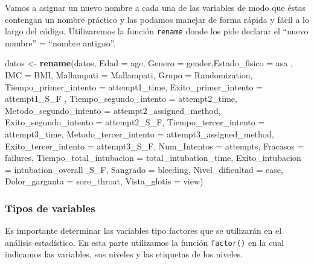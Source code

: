 \documentclass[
]{article}
\newenvironment{Shaded}{\begin{snugshade}}{\end{snugshade}}
\newcommand{\AttributeTok}[1]{\textcolor[rgb]{0.13,0.29,0.53}{#1}}
\newcommand{\FunctionTok}[1]{\textcolor[rgb]{0.13,0.29,0.53}{\textbf{#1}}}
\newcommand{\NormalTok}[1]{#1}
\newcommand{\OtherTok}[1]{\textcolor[rgb]{0.56,0.35,0.01}{#1}}
\begin{document}
Vamos a asignar un nuevo nombre a cada una de las variables de modo que
éstas contengan un nombre práctico y las podamos manejar de forma rápida
y fácil a lo largo del código. Utilizaremos la función \texttt{rename}
donde los pide declarar el ``nuevo nombre'' = ``nombre antiguo''.

\begin{Shaded}
\begin{Highlighting}[]
\NormalTok{datos }\OtherTok{\textless{}{-}} \FunctionTok{rename}\NormalTok{(datos, }\AttributeTok{Edad =}\NormalTok{ age, }\AttributeTok{Genero =}\NormalTok{ gender,}\AttributeTok{Estado\_fisico =}\NormalTok{ asa , }\AttributeTok{IMC =}\NormalTok{ BMI, }\AttributeTok{Mallampati =}\NormalTok{ Mallampati, }\AttributeTok{Grupo =}\NormalTok{ Randomization, }\AttributeTok{Tiempo\_primer\_intento =}\NormalTok{ attempt1\_time, }\AttributeTok{Exito\_primer\_intento =}\NormalTok{ attempt1\_S\_F , }\AttributeTok{Tiempo\_segundo\_intento =}\NormalTok{ attempt2\_time, }\AttributeTok{Metodo\_segundo\_intento =}\NormalTok{ attempt2\_assigned\_method, }\AttributeTok{Exito\_segundo\_intento =}\NormalTok{ attempt2\_S\_F, }\AttributeTok{Tiempo\_tercer\_intento =}\NormalTok{ attempt3\_time, }\AttributeTok{Metodo\_tercer\_intento =}\NormalTok{ attempt3\_assigned\_method, }\AttributeTok{Exito\_tercer\_intento =}\NormalTok{ attempt3\_S\_F, }\AttributeTok{Num\_Intentos =}\NormalTok{ attempts,  }\AttributeTok{Fracasos =}\NormalTok{ failures, }\AttributeTok{Tiempo\_total\_intubacion =}\NormalTok{ total\_intubation\_time, }\AttributeTok{Exito\_intubacion =}\NormalTok{ intubation\_overall\_S\_F, }\AttributeTok{Sangrado =}\NormalTok{ bleeding, }\AttributeTok{Nivel\_dificultad =}\NormalTok{ ease, }\AttributeTok{Dolor\_garganta =}\NormalTok{ sore\_throat, }\AttributeTok{Vista\_glotis =}\NormalTok{ view)}
\end{Highlighting}
\end{Shaded}

\hypertarget{tipos-de-variables}{%
\subsubsection{Tipos de variables}\label{tipos-de-variables}}

Es importante determinar las variables tipo factores que se utilizarán
en el análisis estadístico. En esta parte utilizamos la función
\texttt{factor()} en la cual indicamos las variables, sus niveles y las
etiquetas de los niveles.
\end{document}
